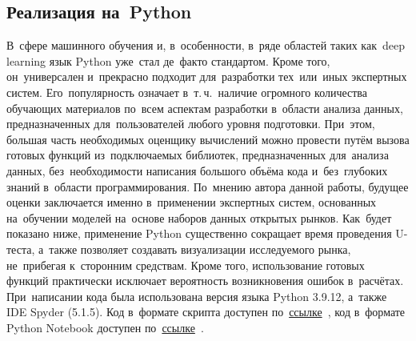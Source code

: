 \documentclass[]{scrartcl}
\begin{document}
\subsection{Реализация на~Python}\label{U-test-Python}
%
%
В~сфере машинного обучения и, в~особенности, в~ряде областей таких как~\foreignlanguage{english}{deep learning} язык Python уже~стал де~факто стандартом. Кроме того, он~универсален и~прекрасно подходит для~разработки тех~или~иных экспертных систем. Его~популярность означает в~т.\,ч.~наличие огромного количества обучающих материалов по~всем аспектам разработки в~области анализа данных, предназначенных для~пользователей любого уровня подготовки. При~этом, большая часть необходимых оценщику вычислений можно провести путём вызова готовых функций из~подключаемых библиотек, предназначенных для~анализа данных, без~необходимости написания большого объёма кода и~без~глубоких знаний в~области программирования. По~мнению автора данной работы, будущее оценки заключается именно в~применении экспертных систем, основанных на~обучении моделей на~основе наборов данных открытых рынков. Как~будет показано ниже, применение Python существенно сокращает время проведения U-теста, а~также позволяет создавать визуализации исследуемого рынка, не~прибегая к~сторонним средствам. Кроме того, использование готовых функций практически исключает вероятность возникновения ошибок в~расчётах. При~написании кода была использована версия языка Python 3.9.12, а~также IDE Spyder (5.1.5). Код в~формате скрипта доступен по~\href{https://github.com/Kirill-Murashev/AI_for_valuers_book/blob/main/Parts-Chapters/Mann-Whitney-Wilcoxon/U-test.py}{ссылке}~\cite{Murashev:U-test.py}, код в~формате \foreignlanguage{english}{Python Notebook}  доступен по~\href{https://github.com/Kirill-Murashev/AI_for_valuers_book/blob/main/Parts-Chapters/Mann-Whitney-Wilcoxon/U-test.ipynb}{ссылке}~\cite{Murashev:U-test.ipynb}.
\end{document}
